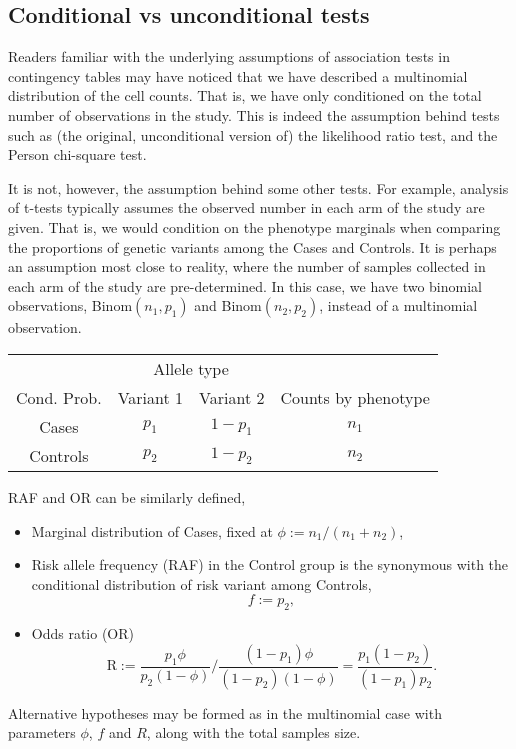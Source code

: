 \subsection{Conditional vs unconditional tests}

Readers familiar with the underlying assumptions of association tests in contingency tables may have noticed that we have described a multinomial distribution of the cell counts.
That is, we have only conditioned on the total number of observations in the study.
This is indeed the assumption behind tests such as (the original, unconditional version of) the likelihood ratio test, and the Person chi-square test.

It is not, however, the assumption behind some other tests.
For example, analysis of t-tests typically assumes the observed number in each arm of the study are given.
That is, we would condition on the phenotype marginals when comparing the proportions of genetic variants among the Cases and Controls.
It is perhaps an assumption most close to reality, where the number of samples collected in each arm of the study are pre-determined.
In this case, we have two binomial observations, Binom$(n_1, p_1)$ and Binom$(n_2, p_2)$, instead of a multinomial observation.
\begin{center}
    \begin{tabular}{cccc}
    \hline
    & \multicolumn{2}{c}{Allele type} \\
    \cline{2-3}
    Cond. Prob. & Variant 1 & Variant 2 & Counts by phenotype \\
    \hline
    Cases & $p_{1}$ & $1-p_{1}$ & $n_1$ \\
    Controls & $p_{2}$ & $1-p_{2}$ & $n_2$ \\
    \hline
    \end{tabular}
\end{center}
RAF and OR can be similarly defined,
\begin{itemize}
    \item Marginal distribution of Cases, fixed at $\phi := n_1/(n_1+n_2)$,
    \item Risk allele frequency (RAF) in the Control group is the synonymous with the conditional distribution of risk variant among Controls, $$f := p_2,$$
    \item Odds ratio (OR)
    $$\text{R} := \frac{p_{1}\phi}{p_{2}(1-\phi)}\Big/\frac{(1-p_{1})\phi}{(1-p_{2})(1-\phi)}
    = \frac{p_{1}(1-p_{2})}{(1-p_{1})p_{2}}.
    $$
\end{itemize}
Alternative hypotheses may be formed as in the multinomial case with parameters $\phi$, $f$ and $R$, along with the total samples size.

